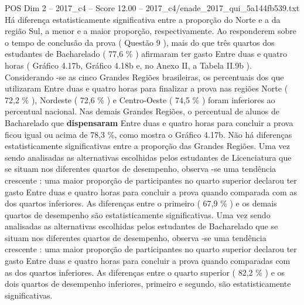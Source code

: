 \begin{textsample}{POS Dim 2 – 2017\_c4 – Score 12.00 – 2017\_c4/enade\_2017\_qui\_5a144fb539.txt}
Há diferença estatisticamente significativa entre a proporção do Norte e a da região Sul, a menor e a maior proporção, respectivamente.
Ao responderem sobre o tempo de conclusão da prova ( Questão 9 ), mais do que três quartos dos estudantes de Bacharelado ( 77,6 \% ) afirmaram ter gasto Entre duas e quatro horas ( Gráfico 4.17b, Gráfico 4.18b e, no Anexo II, a Tabela II.9b ).
Considerando -se as cinco Grandes Regiões brasileiras, os percentuais dos que utilizaram Entre duas e quatro horas para finalizar a prova nas regiões Norte ( 72,2 \% ), Nordeste ( 72,6 \% ) e Centro-Oeste ( 74,5 \% ) foram inferiores ao percentual nacional.
Nas demais Grandes Regiões, o percentual de alunos de Bacharelado que \textbf{dispensaram} Entre duas e quatro horas para concluir a prova ficou igual ou acima de 78,3 \%, como mostra o Gráfico 4.17b.
Não há diferenças estatisticamente significativas entre a proporção das Grandes Regiões.
Uma vez sendo analisadas as alternativas escolhidas pelos estudantes de Licenciatura que se situam nos diferentes quartos de desempenho, observa -se uma tendência crescente : uma maior proporção de participantes no quarto superior declarou ter gasto Entre duas e quatro horas para concluir a prova quando comparada com as dos quartos inferiores.
As diferenças entre o primeiro ( 67,9 \% ) e os demais quartos de desempenho são estatisticamente significativas.
Uma vez sendo analisadas as alternativas escolhidas pelos estudantes de Bacharelado que se situam nos diferentes quartos de desempenho, observa -se uma tendência crescente : uma maior proporção de participantes no quarto superior declarou ter gasto Entre duas e quatro horas para concluir a prova quando comparadas com as dos quartos inferiores.
As diferenças entre o quarto superior ( 82,2 \% ) e os dois quartos de desempenho inferiores, primeiro e segundo, são estatisticamente significativas.

\end{textsample}
